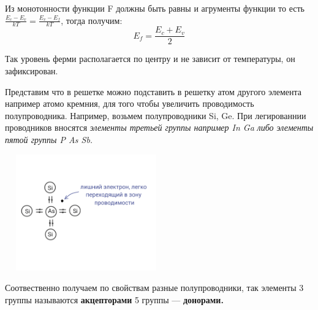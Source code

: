 \documentclass[../main.tex]{subfiles}
\begin{document}
Из монотонности функции F должны быть равны и агрументы функции то есть $\frac{E_c - E_v}{kT} = \frac{E_v - E_f}{kT}$, тогда получим:
\[E_f = \frac{E_c + E_v}{2}\]

Так уровень ферми располагается по центру и не зависит от температуры, он зафиксирован.

Представим что в решетке можно подставить в решетку атом другого элемента например атомо кремния, для того чтобы увеличить проводимость полупроводника.
Например, возьмем полупроводники Si, Ge. При легированнии проводников вносятся \textit{элементы третьей группы например In Ga} \textit{либо элементы пятой группы P As Sb.}
\begin{center}
    \includegraphics[height=5cm, width=7cm]{../img/kvantovy25.png}
\end{center}
Соотвественно получаем по свойствам разные полупроводники, так элементы 3 группы называются \textbf{акцепторами} 5 группы --- \textbf{донорами.}
\end{document}
